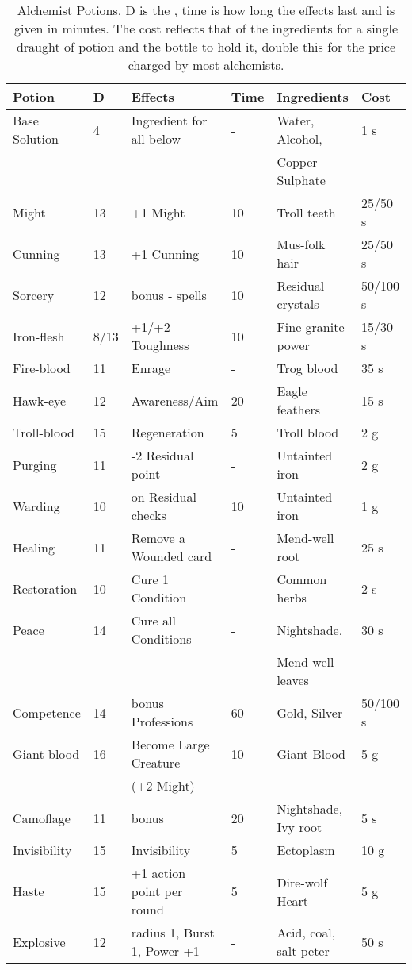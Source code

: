 \documentclass[a4paper,11pt,oneside]{book}
\newcommand{\textlf}[1]{\textbf{\titlecap{#1}}}
\begin{document}
\begin{table}[ht!]
\caption{Alchemist Potions. D is the \textlf{difficulty}, time is how long the effects last and is given in minutes. The cost reflects that of the ingredients for a single draught of potion and the bottle to hold it, double this for the price charged by most alchemists.}
\begin{tabular}{|l|l|l|l|l|l|}
\hline
Potion & D & Effects & Time & Ingredients & Cost \\
\hline
Base Solution & 4 & Ingredient for all below & - & Water, Alcohol,  & 1 s \\
 & & & & Copper Sulphate & \\
\hline
Might &  13 & +1 Might & 10 & Troll teeth & 25/50 s \\
Cunning & 13 & +1 Cunning & 10 & Mus-folk hair & 25/50 s \\
Sorcery & 12 &\textlf{edge} bonus - spells & 10 & Residual crystals & 50/100 s\\
Iron-flesh & 8/13 & +1/+2 Toughness & 10 & Fine granite power & 15/30 s \\
Fire-blood & 11 & Enrage & - & Trog blood & 35 s \\
Hawk-eye & 12 & \textlf{edge} Awareness/Aim & 20 & Eagle feathers & 15 s \\
Troll-blood & 15 & Regeneration & 5 & Troll blood & 2 g \\
Purging & 11 & -2 Residual point & - & Untainted iron & 2 g\\
Warding & 10 & \textlf{edge} on Residual checks & 10 & Untainted iron & 1 g \\ 
Healing & 11 & Remove a Wounded card & - & Mend-well root & 25 s \\
Restoration & 10 & Cure 1 Condition & - & Common herbs & 2 s \\
Peace & 14 & Cure all Conditions & - & Nightshade,  & 30 s \\
 & & & & Mend-well leaves & \\
Competence & 14 & \textlf{edge} bonus Professions & 60 & Gold, Silver & 50/100 s \\
Giant-blood & 16 & Become Large Creature  & 10 & Giant Blood & 5 g \\
 & & (+2 Might) & & & \\
Camoflage & 11 & \textlf{Stealth edge} bonus & 20 & Nightshade, Ivy root & 5 s \\
Invisibility & 15 & Invisibility & 5 & Ectoplasm & 10 g \\
Haste & 15 & +1 action point per round & 5 & Dire-wolf Heart & 5 g \\ 
Explosive & 12 & radius 1, Burst 1, Power +1 & - & Acid, coal, salt-peter & 50 s \\
\hline
\end{tabular}
\label{tab:alch}
\end{table}
\end{document}
